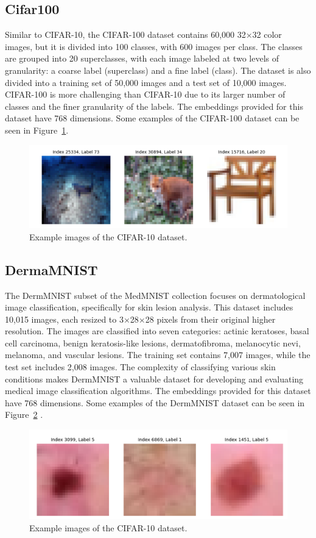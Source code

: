 \documentclass[a4paper]{article}
\begin{document}
\subsection{Cifar100}\label{cifar100}
Similar to CIFAR-10, the CIFAR-100 dataset \citep{Krizhevsky2009} contains 60,000 32×32 color images, but it is divided into 100 classes, with 600 images per class. The classes are grouped into 20 superclasses, with each image labeled at two levels of granularity: a coarse label (superclass) and a fine label (class). The dataset is also divided into a training set of 50,000 images and a test set of 10,000 images. CIFAR-100 is more challenging than CIFAR-10 due to its larger number of classes and the finer granularity of the labels. The embeddings provided for this dataset have 768 dimensions. Some examples of the CIFAR-100 dataset can be seen in Figure~\ref{fig:cifar100}.

\begin{figure}[h]
  \centering
  \includegraphics[width=0.5\linewidth]{images/cifar100_images.png}
  \caption{Example images of the CIFAR-10 dataset.}\label{fig:cifar100}
\end{figure}

\subsection{DermaMNIST}\label{DermaMNIST}
The DermMNIST subset of the MedMNIST collection focuses on dermatological image classification, specifically for skin lesion analysis. This dataset includes 10,015 images, each resized to 3×28×28 pixels from their original higher resolution. The images are classified into seven categories: actinic keratoses, basal cell carcinoma, benign keratosis-like lesions, dermatofibroma, melanocytic nevi, melanoma, and vascular lesions. The training set contains 7,007 images, while the test set includes 2,008 images. The complexity of classifying various skin conditions makes DermMNIST a valuable dataset for developing and evaluating medical image classification algorithms. The embeddings provided for this dataset have 768 dimensions. Some examples of the DermMNIST dataset can be seen in Figure~\ref{fig:dermamnist} \citep{medmnistv1, medmnistv2}.

\begin{figure}[h]
  \centering
  \includegraphics[width=0.5\linewidth]{images/dermamnist_images.png}
  \caption{Example images of the CIFAR-10 dataset.}\label{fig:dermamnist}
\end{figure}
\end{document}
